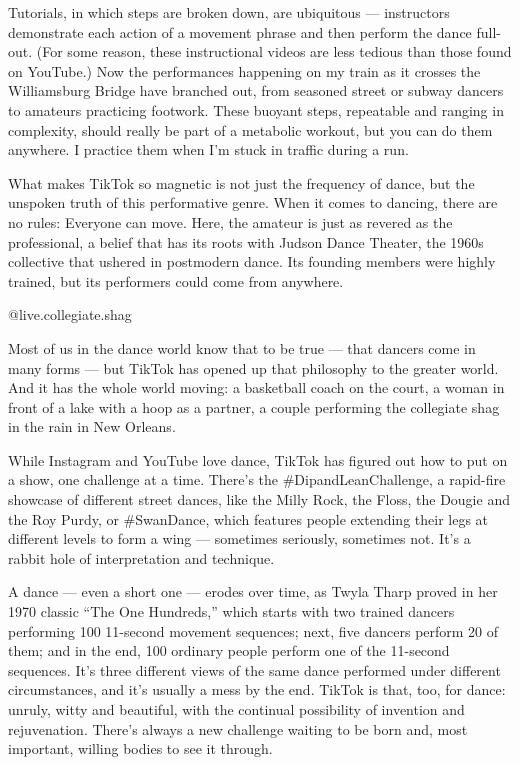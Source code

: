 Tutorials, in which steps are broken down, are ubiquitous ---
instructors demonstrate each action of a movement phrase and then
perform the dance full-out. (For some reason, these instructional videos
are less tedious than those found on YouTube.) Now the performances
happening on my train as it crosses the Williamsburg Bridge have
branched out, from seasoned street or subway dancers to amateurs
practicing footwork. These buoyant steps, repeatable and ranging in
complexity, should really be part of a metabolic workout, but you can do
them anywhere. I practice them when I'm stuck in traffic during a run.

What makes TikTok so magnetic is not just the frequency of dance, but
the unspoken truth of this performative genre. When it comes to dancing,
there are no rules: Everyone can move. Here, the amateur is just as
revered as the professional, a belief that has its roots with Judson
Dance Theater, the 1960s collective that ushered in postmodern dance.
Its founding members were highly trained, but its performers could come
from anywhere.

\href{https://www.tiktok.com/@live.collegiate.shag/video/6740735611616939270?u_code=cm1d04c8g06e8k\&preview_pb=0\&language=en\&timestamp=1570113651\&utm_campaign=client_share\&app=musically\&utm_medium=ios\&user_id=6532049790534942722\&tt_from=copy\&utm_source=copy\&enter_from=h5_m}{}

@live.collegiate.shag

Most of us in the dance world know that to be true --- that dancers come
in many forms --- but TikTok has opened up that philosophy to the
greater world. And it has the whole world moving: a basketball coach on
the court, a woman in front of a lake with a hoop as a partner, a couple
performing the collegiate shag in the rain in New Orleans.

While Instagram and YouTube love dance, TikTok has figured out how to
put on a show, one challenge at a time. There's the
\#DipandLeanChallenge, a rapid-fire showcase of different street dances,
like the Milly Rock, the Floss, the Dougie and the Roy Purdy, or
\#SwanDance, which features people extending their legs at different
levels to form a wing --- sometimes seriously, sometimes not. It's a
rabbit hole of interpretation and technique.

A dance --- even a short one --- erodes over time, as Twyla Tharp proved
in her 1970 classic ``The One Hundreds,'' which starts with two trained
dancers performing 100 11-second movement sequences; next, five dancers
perform 20 of them; and in the end, 100 ordinary people perform one of
the 11-second sequences. It's three different views of the same dance
performed under different circumstances, and it's usually a mess by the
end. TikTok is that, too, for dance: unruly, witty and beautiful, with
the continual possibility of invention and rejuvenation. There's always
a new challenge waiting to be born and, most important, willing bodies
to see it through.

